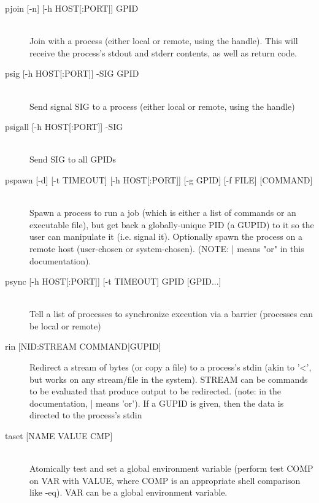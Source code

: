 \begin{description}

\item[pjoin [-n{]} [-h HOST[:PORT{]}{]} GPID]\hfill \\
Join with a process (either local or remote, using
the handle). This will receive the process's stdout and stderr contents, as
well as return code.

\item[psig [-h HOST[:PORT{]}{]} -SIG GPID]\hfill \\
Send signal SIG to a process (either local or
remote, using the handle)

\item[psigall [-h HOST[:PORT{]}{]} -SIG]\hfill \\
Send SIG to all GPIDs

\item[pspawn [-d{]} [-t TIMEOUT{]} [-h HOST[:PORT{]}{]} [-g GPID{]} [-f FILE{]} [COMMAND{]}]\hfill \\
Spawn a process to run a job (which is
either a list of commands or an executable file), but get back a
globally-unique PID (a GUPID) to it so the user can manipulate it (i.e. signal
it). Optionally spawn the process on a remote host (user-chosen or
system-chosen). (NOTE: | means "or" in this documentation).

\item[psync [-h HOST[:PORT{]}{]} [-t TIMEOUT{]} GPID [GPID...{]}]\hfill \\
Tell a list of processes to synchronize
execution via a barrier (processes can be local or remote)

\item[rin [NID:STREAM COMMAND|GUPID{]}] 
Redirect a stream of bytes
(or copy a file) to a process's stdin (akin to '<', but works on any
stream/file in the system). STREAM can be commands to be evaluated that produce
output to be redirected. (note: in the documentation, | means 'or'). If a GUPID
is given, then the data is directed to the process's stdin


\item[taset [NAME VALUE CMP{]}]\hfill \\
Atomically test and set a global environment
variable (perform test COMP on VAR with VALUE, where COMP is an appropriate
shell comparison like -eq). VAR can be a global environment variable.

\end{description}




